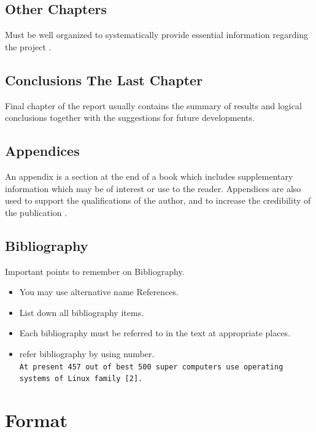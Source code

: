 \subsection{Other Chapters}

Must be well organized to systematically provide essential information regarding the project \cite{George1993,Michel1993,Peter1990}.

\subsection{Conclusions  The Last Chapter}

Final chapter of the report usually contains the summary of results and logical conclusions together with the suggestions for future developments.

\subsection{Appendices}

An appendix  is a section at the end of a book which includes supplementary information which may be of interest 
or use to the reader. Appendices are also used to support the qualifications of the author, and to increase the credibility of the publication \cite{Xtreport}.

\subsection{Bibliography}

Important points to remember on Bibliography.\\

\begin{itemize}
   \item You may use alternative name References.
   \item List down all bibliography items.
   \item Each bibliography must be referred to in the text at appropriate places.
   \item refer bibliography by using number. \\
   \texttt{At present 457 out of best 500 super computers use operating systems of Linux family [2]. }
\end{itemize}
 

\section{Format}
 
